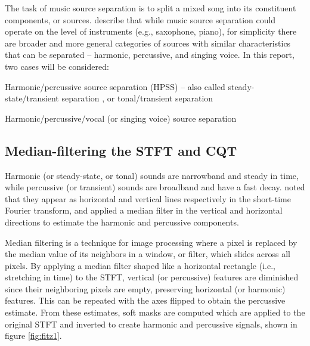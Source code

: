 \documentclass[letter,12pt]{article}
\newenvironment{tight_enumerate}{
\begin{enumerate}
  \setlength{\itemsep}{0pt}
  \setlength{\parskip}{0pt}
}{\end{enumerate}}
\begin{document}
The task of music source separation is to split a mixed song into its constituent components, or sources. \citet{musicsepgood} describe that while music source separation could operate on the level of instruments (e.g., saxophone, piano), for simplicity there are broader and more general categories of sources with similar characteristics that can be separated -- harmonic, percussive, and singing voice. In this report, two cases will be considered:

\begin{tight_enumerate}
	\item
		Harmonic/percussive source separation (HPSS) -- also called steady-state/transient separation \cite{bayarres}, or tonal/transient separation \cite{tfjigsaw, wmdct}
	\item
		Harmonic/percussive/vocal (or singing voice) source separation
\end{tight_enumerate}

\subsection{Median-filtering the STFT and CQT}

Harmonic (or steady-state, or tonal) sounds are narrowband and steady in time, while percussive (or transient) sounds are broadband and have a fast decay. \citet{fitzgerald1} noted that they appear as horizontal and vertical lines respectively in the short-time Fourier transform, and applied a median filter in the vertical and horizontal directions to estimate the harmonic and percussive components.

Median filtering is a technique for image processing where a pixel is replaced by the median value of its neighbors in a window, or filter, which slides across all pixels. By applying a median filter shaped like a horizontal rectangle (i.e., stretching in time) to the STFT, vertical (or percussive) features are diminished since their neighboring pixels are empty, preserving horizontal (or harmonic) features. This can be repeated with the axes flipped to obtain the percussive estimate. From these estimates, soft masks are computed which are applied to the original STFT and inverted to create harmonic and percussive signals, shown in figure \ref{fig:fitz1}.
\end{document}
